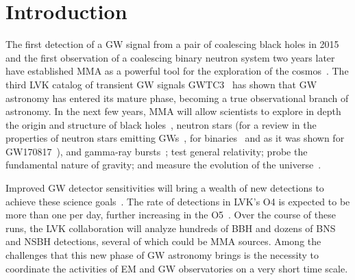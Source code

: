 \section{Introduction\label{intro}}

The first detection of a \ac{GW} signal from a pair of coalescing black holes in 2015 and the first observation of a coalescing binary neutron system two years later
have established \ac{MMA} as a powerful tool for the exploration of the cosmos~\cite{LIGOScientific:2016aoc,LIGOScientific:2017vwq}. The third \ac{LVK} catalog of transient \ac{GW} signals \ac{GWTC3}~\cite{LIGOScientific:2021djp}
has shown that \ac{GW} astronomy has entered its mature phase, becoming a true observational branch of astronomy. In the next few years, \ac{MMA} will allow scientists
to explore in depth the origin and structure of black holes~\cite{Nitz:2021zwj,Schmidt:2020ekt}, neutron stars (for a review in the properties of neutron stars emitting GWs~\cite{Lasky:2015uia}, for binaries~\cite{Baiotti:2016qnr} and as it was shown for GW170817~\cite{LIGOScientific:2018cki}), and gamma-ray bursts~\cite{Ciolfi:2018tal}; test general relativity; probe the fundamental nature of gravity; and
measure the evolution of the universe~\cite{LIGOScientific:2021sio,LIGOScientific:2021psn,LIGOScientific:2021aug}.

Improved \ac{GW} detector sensitivities will bring a wealth of new detections to achieve these science goals~\cite{LIGOScientific:2014pky,VIRGO:2014yos}. The rate
of detections in \ac{LVK}'s \ac{O4} is expected to be more than one per day, further increasing in the \ac{O5}~\cite{KAGRA:2013rdx}. Over the course of
these runs, the \ac{LVK} collaboration will analyze hundreds of \ac{BBH} and dozens of \ac{BNS} and \ac{NSBH} detections, several of which could be \ac{MMA} sources. Among the
challenges that this new phase of \ac{GW} astronomy brings is the necessity to coordinate the activities of \ac{EM} and \ac{GW} observatories on a very short time
scale. 

